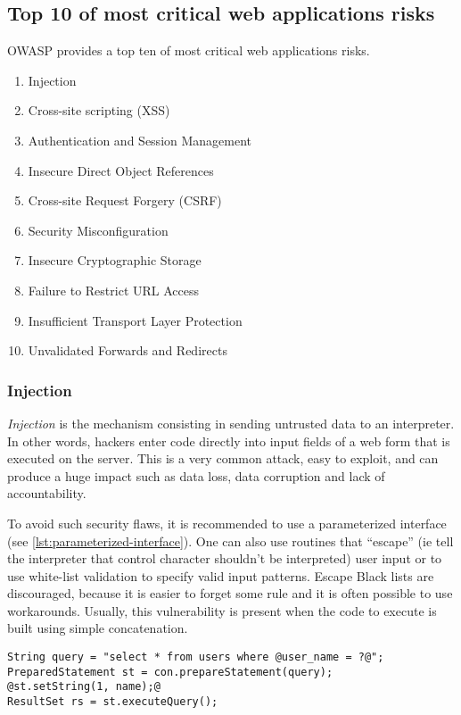 \subsection{Top 10 of most critical web applications risks}

OWASP provides a top ten of most critical web applications risks.
\begin{enumerate}
\item Injection
\item Cross-site scripting (XSS)
\item Authentication and Session Management
\item Insecure Direct Object References
\item Cross-site Request Forgery (CSRF)
\item Security Misconfiguration
\item Insecure Cryptographic Storage
\item Failure to Restrict URL Access
\item Insufficient Transport Layer Protection
\item Unvalidated Forwards and Redirects
\end{enumerate}

\subsubsection{Injection}

\emph{Injection} is the mechanism consisting in sending untrusted data to an
interpreter. In other words, hackers enter code directly into input fields of
a web form that is executed on the server.
This is a very common attack, easy to exploit, and can produce a huge impact
such as data loss, data corruption and lack of accountability.


To avoid such security flaws, it is recommended to use a parameterized
interface (see \autoref{lst:parameterized-interface}). One can also use
routines that ``escape'' (ie tell the interpreter that control
character shouldn't be interpreted) user input or to
use white-list validation to specify valid input patterns. Escape
Black lists are discouraged, because it is easier to forget some rule and
it is often possible to use workarounds.
Usually, this vulnerability is present when the code to execute is built using
simple concatenation.

\begin{lstlisting}[style=beamer,
	caption={Parameterized interface in Java},
	label=lst:parameterized-interface]
String query = "select * from users where @user_name = ?@";
PreparedStatement st = con.prepareStatement(query);
@st.setString(1, name);@
ResultSet rs = st.executeQuery();
\end{lstlisting}

